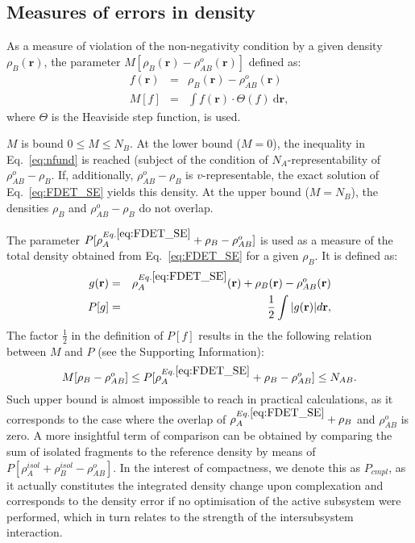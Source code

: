 \documentclass[journal=jctcce,manuscript=article]{achemso}
\newcommand{\nr}[1]{\color{red}#1\color{black}}
\begin{document}
\subsection{Measures of errors in density}
As a measure of violation of the non-negativity condition by a given density $\rho_{B}(\mathbf{r})$, the
 parameter $M[\rho_{B}(\mathbf{r})-\rho^{o}_{AB}(\mathbf{r})]$ defined as:
\begin{eqnarray}\label{eq:M}
f(\mathbf{r})&=&\rho_{B}(\mathbf{r})-\rho^{o}_{AB}(\mathbf{r}) \nonumber\\
 M[f] & = & \int f(\mathbf{r})\cdot \Theta(f) \ \mathrm{d}\mathbf{r}, \label{eq:def_M}
\end{eqnarray}
where $\Theta$ is the Heaviside step function, is used.

$M$ is bound $0 \le M\le N_{B}$. At the lower bound ($M=0$), the inequality in Eq.~\ref{eq:nfund} is reached (subject of the condition of $N_A$-representability of $\rho^{o}_{AB}-\rho_{B}$. If, additionally,  $\rho^{o}_{AB}-\rho_{B}$ is $v$-representable, the exact solution of Eq.~\ref{eq:FDET_SE} yield\nr{s } this density.  At the upper bound ($M=N_{B}$), the densities $\rho_{B}$ and $\rho^{o}_{AB}-\rho_{B}$ do not overlap.

The parameter $P[\rho_A^{Eq.\ref{eq:FDET_SE}}+\rho_B-\rho_{AB}^{o}]$ is used as a measure of the  total density obtained from Eq.~\ref{eq:FDET_SE}
for a given $\rho_{B}$. It is defined as: 
\begin{eqnarray}
g(\mathbf{r})&=&\rho^{Eq.\ref{eq:FDET_SE}}_A(\mathbf{r})+ \rho_B(\mathbf{r}) - \rho_{AB}^{o}(\mathbf{r}) \nonumber\\
 P[g] &=& \frac{1}{2} 
 \int \vert g(\mathbf{r})  \vert d\mathbf{r}, \label{eq:def_P}
\end{eqnarray}
The factor  $\frac{1}{2}$ in the definition of $P[f]$ results in
the the following relation between $M$ and $P$ (see the Supporting Information):
\begin{equation} \label{eq:P_bound}
 M[\rho_{B} - \rho^{o}_{AB}] \leq P[\rho^{Eq.\ref{eq:FDET_SE}}_A+\rho_B - \rho_{AB}^{o}]  \leq %
  N_{AB}.
\end{equation}
\nr{Such upper bound is almost impossible to reach in practical calculations, as it corresponds to the case where the overlap of $\rho^{Eq.\ref{eq:FDET_SE}}_A+\rho_B$ and $\rho_{AB}^{o}$ is zero. A more insightful term of comparison can be obtained by comparing the sum of isolated fragments to the reference density by means of $P[\rho_A^{isol}+\rho_B^{isol} - \rho_{AB}^{o}]$. In the interest of compactness, we denote this as $P_{cmpl}$, as it actually constitutes the integrated density change upon complexation and corresponds to the density error if no optimisation of the active subsystem were performed, which in turn relates to the strength of the intersubsystem interaction.}
\end{document}
